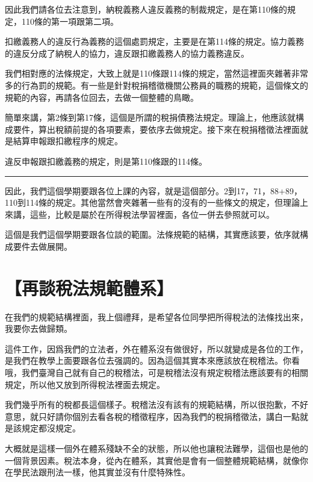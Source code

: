 \documentclass[oneside,sub3section]{ctexbook}
\begin{document}
因此我們請各位去注意到，納稅義務人違反義務的制裁規定，是在第110條的規定，110條的第一項跟第二項。

扣繳義務人的違反行為義務的這個處罰規定，主要是在第114條的規定。協力義務的違反分成了納稅人的協力，違反跟扣繳義務人的協力義務違反。

我們相對應的法條規定，大致上就是110條跟114條的規定，當然這裡面夾雜著非常多的行為罰的規範。有一些是針對稅捐稽徵機關公務員的職務的規範，這個條文的規範的內容，再請各位回去，去做一個整體的鳥瞰。

簡單來講，第2條到第17條，這個是所謂的稅捐債務法規定。理論上，他應該就構成要件，算出稅額前提的各項要素，要依序去做規定。接下來在稅捐稽徵法裡面就是結算申報跟扣繳程序的規定。

違反申報跟扣繳義務的規定，則是第110條跟的114條。

\begin{center}\rule{0.5\linewidth}{0.5pt}\end{center}

因此，我們這個學期要跟各位上課的內容，就是這個部分。2到17，71，88+89，110到114條的規定。其他當然會夾雜著一些有的沒有的一些條文的規定，但理論上來講，這些，比較是屬於在所得稅法學習裡面，各位一併去參照就可以。

這個是我們這個學期要跟各位談的範圍。法條規範的結構，其實應該要，依序就構成要件去做展開。

\hypertarget{ux518dux8ac7ux7a05ux6cd5ux898fux7bc4ux9ad4ux7cfb}{%
\section{【再談稅法規範體系】}\label{ux518dux8ac7ux7a05ux6cd5ux898fux7bc4ux9ad4ux7cfb}}

在我們的規範結構裡面，我上個禮拜，是希望各位同學把所得稅法的法條找出來，我要你去做歸類。

這件工作，因爲我們的立法者，外在體系沒有做很好，所以就變成是各位的工作，是我們在教學上面要跟各位去强調的。因為這個其實本來應該放在稅稽法。你看哦，我們臺灣自己就有自己的稅稽法，可是稅稽法沒有規定稅稽法應該要有的相關規定，所以他又放到所得稅法裡面去規定。

我們幾乎所有的稅都長這個樣子。稅稽法沒有該有的規範結構，所以很抱歉，不好意思，就只好請你個別去看各稅的稽徵程序，因為我們的稅捐稽徵法，講白一點就是該規定都沒規定。

大概就是這樣一個外在體系殘缺不全的狀態，所以他也讓稅法難學，這個也是他的一個背景因素。稅法本身，從內在體系，其實他是會有一個整體規範結構，就像你在學民法跟刑法一樣，他其實並沒有什麼特殊性。
\end{document}
